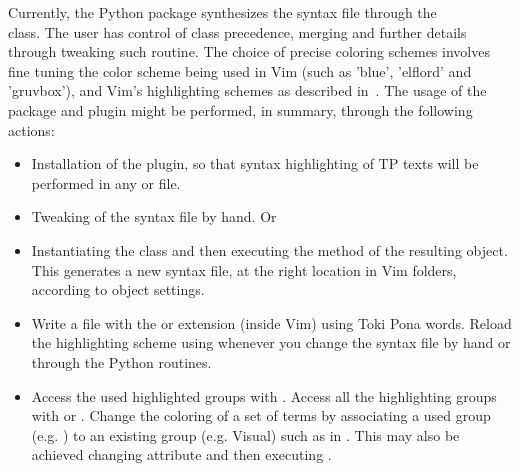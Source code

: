 Currently, the Python package synthesizes the
syntax file through the\\  class.
The user has control of class precedence,
merging and further details through tweaking such routine.
The choice of precise coloring schemes
involves fine tuning the color scheme being
used in Vim (such as 'blue', 'elflord' and 'gruvbox'),
and Vim's highlighting schemes as described in~\cite{vim}.
The usage of the package and plugin might be performed,
in summary, through the following actions:
\begin{itemize}
  \item Installation of the plugin, so that
    syntax highlighting of TP texts will be performed in any  or  file.
  \item Tweaking of the syntax file by hand. Or
  \item Instantiating the  class and then executing the  method
    of the resulting object.
    This generates a new  syntax file, at the right location in Vim folders,
    according to object settings.
  \item Write a file with the  or  extension
    (inside Vim) using Toki Pona words.
    Reload the highlighting scheme using  whenever you
    change the syntax file by hand or through the Python routines.
  \item Access the used highlighted groups with .
    Access all the highlighting groups with  or .
    Change the coloring of a set of terms by associating
    a used group (e.g. ) to an existing group (e.g.
    Visual) such as in .
    This may also be achieved changing 
    attribute and then executing .
\end{itemize}

